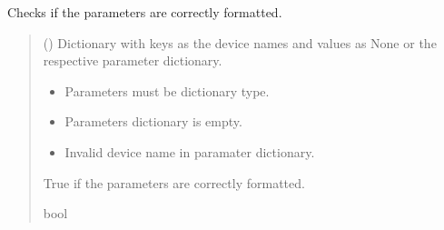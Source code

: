 \documentclass[letterpaper,10pt,english]{sphinxmanual}
\begin{document}
\begin{fulllineitems}
\begin{fulllineitems}
\label{\detokenize{Setup.SetupAllDevices:Setup.SetupAllDevices.Setup_PodDevices.SetupAll._CheckForValidParams}}
\pysigstartsignatures
{}
\pysigstopsignatures
\sphinxAtStartPar
Checks if the parameters are correctly formatted.
\begin{quote}\begin{description}
\sphinxAtStartPar
{} (\sphinxstyleliteralemphasis{\sphinxupquote{{[}}}\sphinxstyleliteralemphasis{\sphinxupquote{,}}\sphinxstyleliteralemphasis{\sphinxupquote{ | }}\sphinxstyleliteralemphasis{\sphinxupquote{{]}}}) \textendash{} Dictionary with keys as the device names and                 values as None or the respective parameter dictionary.

\begin{itemize}
\item {} 
\sphinxAtStartPar
{} \textendash{} Parameters must be dictionary type.

\item {} 
\sphinxAtStartPar
{} \textendash{} Parameters dictionary is empty.

\item {} 
\sphinxAtStartPar
{} \textendash{} Invalid device name in paramater dictionary.

\end{itemize}

\sphinxAtStartPar
True if the parameters are correctly formatted.

\sphinxAtStartPar
bool

\end{description}\end{quote}

\end{fulllineitems}


\end{fulllineitems}
\end{document}
